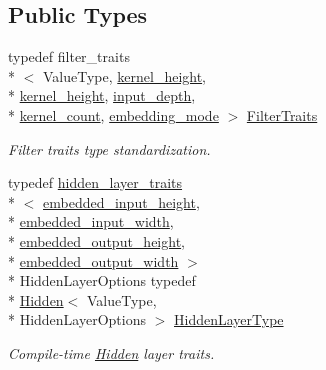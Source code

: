 \subsection*{Public Types}
\begin{DoxyCompactItemize}
\item 
typedef filter\-\_\-traits\\*
$<$ Value\-Type, \hyperlink{structffnn_1_1layer_1_1convolution__layer__options_adfab0e8e8f7e9537dc60a0e56e311161}{kernel\-\_\-height}, \\*
\hyperlink{structffnn_1_1layer_1_1convolution__layer__options_adfab0e8e8f7e9537dc60a0e56e311161}{kernel\-\_\-height}, \hyperlink{structffnn_1_1layer_1_1convolution__layer__options_ae4d23d286d13ecb3a1127bcf34569137}{input\-\_\-depth}, \\*
\hyperlink{structffnn_1_1layer_1_1convolution__layer__options_a666df8b2074fb8e749f4a8ecd7d89957}{kernel\-\_\-count}, \hyperlink{structffnn_1_1layer_1_1convolution__layer__options_a7f7a41732d32af9009d9c6185a4eef5a}{embedding\-\_\-mode} $>$ \hyperlink{structffnn_1_1layer_1_1convolution__layer__options_a1677fcd2e770f3511589468a702c744e}{Filter\-Traits}
\begin{DoxyCompactList}\small\item\em Filter traits type standardization. \end{DoxyCompactList}\item 
typedef \hyperlink{structffnn_1_1layer_1_1hidden__layer__traits}{hidden\-\_\-layer\-\_\-traits}\\*
$<$ \hyperlink{structffnn_1_1layer_1_1convolution__layer__options_adbb07df9a83a76fecd9edb9666a8bbc6}{embedded\-\_\-input\-\_\-height}, \\*
\hyperlink{structffnn_1_1layer_1_1convolution__layer__options_a82638f50ec7f1028bb43c0a856c1e8ba}{embedded\-\_\-input\-\_\-width}, \\*
\hyperlink{structffnn_1_1layer_1_1convolution__layer__options_ae2a4d380f8f534b7df22a264ba18caa7}{embedded\-\_\-output\-\_\-height}, \\*
\hyperlink{structffnn_1_1layer_1_1convolution__layer__options_a9c1afe561f9ecbd8f212e260b3fbcd9e}{embedded\-\_\-output\-\_\-width} $>$\\*
 Hidden\-Layer\-Options typedef \\*
\hyperlink{classffnn_1_1layer_1_1_hidden}{Hidden}$<$ Value\-Type, \\*
Hidden\-Layer\-Options $>$ \hyperlink{structffnn_1_1layer_1_1convolution__layer__options_a9bec981bff4243402aed35a211f45f47}{Hidden\-Layer\-Type}
\begin{DoxyCompactList}\small\item\em Compile-\/time \hyperlink{classffnn_1_1layer_1_1_hidden}{Hidden} layer traits. \end{DoxyCompactList}\end{DoxyCompactItemize}
